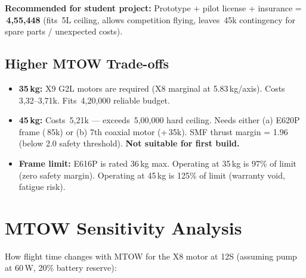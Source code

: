 \documentclass[11pt,a4paper]{article}
\newcommand{\Rs}{\rupee\,}
\begin{document}
\noindent \textbf{Recommended for student project:} Prototype + pilot license + insurance = \textbf{\Rs{}4,55,448} (fits \Rs{}5L ceiling, allows competition flying, leaves \Rs{}45k contingency for spare parts / unexpected costs).


\subsection{Higher MTOW Trade-offs}
\begin{itemize}
  \item \textbf{35\,kg:} X9 G2L motors are required (X8 marginal at 5.83\,kg/axis). Costs \Rs{}3,32--3,71k. Fits \Rs{}4,20,000 reliable budget.
  \item \textbf{45\,kg:} Costs \Rs{}5,21k --- exceeds \Rs{}5,00,000 hard ceiling. Needs either (a) E620P frame (\Rs{}85k) or (b) 7th coaxial motor (+\Rs{}35k). SMF thrust margin = 1.96 (below 2.0 safety threshold). \textbf{Not suitable for first build.}
  \item \textbf{Frame limit:} E616P is rated 36\,kg max. Operating at 35\,kg is 97\% of limit (zero safety margin). Operating at 45\,kg is 125\% of limit (warranty void, fatigue risk).
\end{itemize}

\section{MTOW Sensitivity Analysis}

How flight time changes with MTOW for the X8 motor at 12S (assuming pump at 60\,W, 20\% battery reserve):
\end{document}
